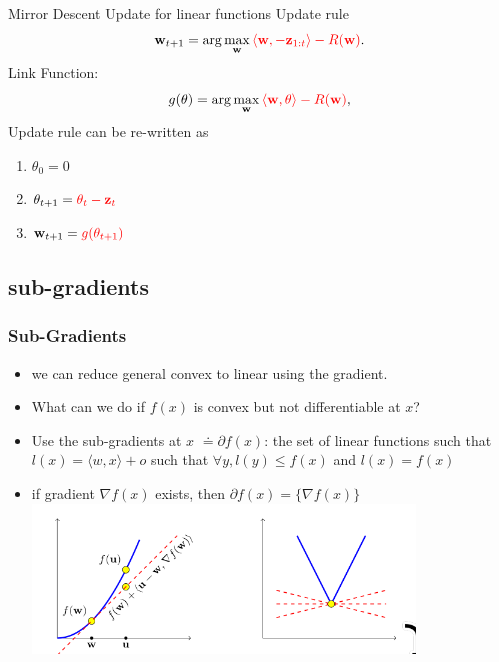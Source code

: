 \documentclass[handout]{beamer}
\begin{document}
\begin{frame}{Mirror Descent Update for linear functions}
  Update rule
  \[
    \mathbf{w}_{t+1} = \arg\max_{\mathbf{w}} \textcolor{mathcolor}{ \langle \mathbf{w}, -\mathbf{z}_{1:t} \rangle - R(\mathbf{w}) }.
  \]
Link Function:
\[
g(\theta) = \arg\max_{\mathbf{w}} \textcolor{mathcolor}{ \langle \mathbf{w}, \theta \rangle - R(\mathbf{w}) },
\]
Update rule can be re-written as
\begin{enumerate}
  \item $\theta_0=0$
    \item \( \theta_{t+1} = \textcolor{mathcolor}{\theta_t - \mathbf{z}_t} \)
    \item \( \mathbf{w}_{t+1} = \textcolor{mathcolor}{g(\theta_{t+1})} \)
\end{enumerate}
\end{frame}

\subsection{sub-gradients}
\begin{frame}
  \frametitle{Sub-Gradients}
  \begin{itemize}
  \item we can reduce general convex to linear using the gradient.
  \item   What can we do if $f(x)$ is convex but not differentiable at $x$?
  \item Use the sub-gradients at $x$ $\doteq\partial f(x)$: the set of linear functions such that
    $l(x)=\langle w,x \rangle + o$ such that
    $\forall y, l(y) \leq f(x)$ and $l(x) = f(x)$
  \item if gradient $\nabla f(x)$ exists, then $\partial f(x) = \{\nabla f(x)\}$
    \includegraphics[width=0.8\textwidth]{figures/SubGradient.png}
  \end{itemize}
  
\end{frame}
\end{document}
